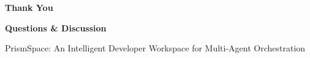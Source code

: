 \begin{frame}
    \centering
    \vfill
    {\color{prismNavy}\Huge \textbf{Thank You}}
    
    \vspace{0.8cm}
    {\large \textbf{Questions \& Discussion}}
    
    \vspace{0.8cm}
    {\small \color{prismBlue} PrismSpace: An Intelligent Developer Workspace for Multi-Agent Orchestration}
    \vfill
\end{frame}
